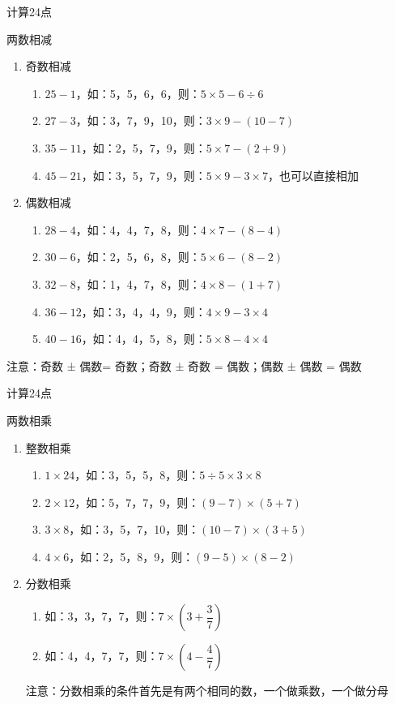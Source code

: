 \documentclass[aspectratio=169]{ctexbeamer} %
\begin{document}
\begin{frame}[t]{计算24点}
\begin{spacing}{1.2}
\normalsize
\alert{两数相减}
\begin{enumerate}[label={\arabic*.}]
\item 奇数相减
	\begin{enumerate}[label={\Alph*.}]
	\item $25 - 1$，如：5，5，6，6，则：$5 \times 5 - 6 \div 6$
	\item $27 - 3$，如：3，7，9，10，则：$3 \times 9 - (10 - 7)$
	\item $35 - 11$，如：2，5，7，9，则：$5 \times 7 - (2 + 9)$	
	\item $45 - 21$，如：3，5，7，9，则：$5 \times 9 - 3 \times 7$，也可以直接相加
	\end{enumerate}
\item 偶数相减
	\begin{enumerate}[label={\Alph*.}]
	\item $28 - 4$，如：4，4，7，8，则：$4 \times 7 - (8 - 4)$
	\item $30 - 6$，如：2，5，6，8，则：$5 \times 6 - (8 - 2)$
	\item $32 - 8$，如：1，4，7，8，则：$4 \times 8 - (1 + 7)$
	\item $36 - 12$，如：3，4，4，9，则：$4 \times 9 - 3 \times 4$
	\item $40 - 16$，如：4，4，5，8，则：$5 \times 8 - 4 \times 4$		
	\end{enumerate}
\end{enumerate}
\alert{注意：奇数 ± 偶数= 奇数；奇数 ± 奇数 = 偶数；偶数 ± 偶数 = 偶数}
\end{spacing}
\end{frame}

\begin{frame}[t]{计算24点}
\begin{spacing}{1.2}
\normalsize
\alert{两数相乘}
\begin{enumerate}[label={\arabic*.}]
\item 整数相乘
	\begin{enumerate}[label={\Alph*.}]
	\item $1 \times 24$，如：3，5，5，8，则：$5 \div 5 \times 3 \times 8$
	\item $2 \times 12$，如：5，7，7，9，则：$(9-7) \times (5+7)$
	\item $3 \times 8$，如：3，5，7，10，则：$(10-7) \times (3+5)$
	\item $4 \times 6$，如：2，5，8，9，则：$(9-5) \times (8-2)$
	\end{enumerate}
\item 分数相乘
	\begin{enumerate}[label={\Alph*.}]
	\item 如：3，3，7，7，则：$7 \times \left( 3 + \dfrac{3}{7} \right)$
	\item 如：4，4，7，7，则：$7 \times \left(4 - \dfrac{4}{7} \right)$
	\end{enumerate}
	\alert{注意：分数相乘的条件首先是有两个相同的数，一个做乘数，一个做分母}
\end{enumerate}
\end{spacing}
\end{frame}
\end{document}
